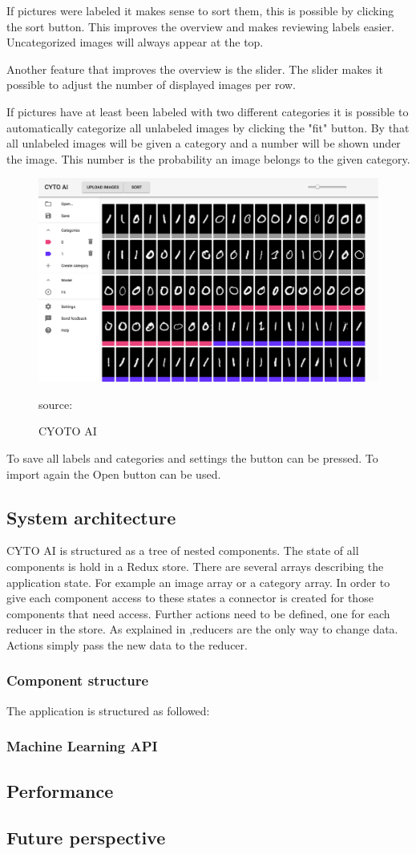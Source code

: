 If pictures were labeled it makes sense to sort them, this is possible by clicking the sort button. This improves the overview and makes reviewing labels easier. Uncategorized images will always appear at the top.

Another feature that improves the overview is the slider. The slider makes it possible to adjust the number of displayed images per row. 

If pictures have at least been labeled with two different categories it is possible to automatically categorize all unlabeled images by clicking the "fit" button. By that all unlabeled images will be given a category and a number will be shown under the image. This number is the probability an image belongs to the given category.

\begin{figure}[H]
	\centering
	\includegraphics[width=0.8\linewidth]{bilder/cyto/cyto.png}
	\caption{CYOTO AI} source:\cite{Component}
	\label{fig:COMPONENT}
\end{figure}

To save all labels and categories and settings the button can be pressed. To import again the Open button can be used.


\subsection{System architecture}
CYTO AI is structured as a tree of nested components. The state of all components is hold in a Redux store. There are several arrays describing the application state. For example an image array or a category array. In order to give each component access to these states a connector is created for those components that need access. Further actions need to be defined, one for each reducer in the store. As explained in ,reducers are the only way to change data. Actions simply pass the new data to the reducer.


 
\subsubsection{Component structure}
The application is structured as followed:


\subsubsection{Machine Learning API}

\subsection{Performance}

\subsection{Future perspective}




